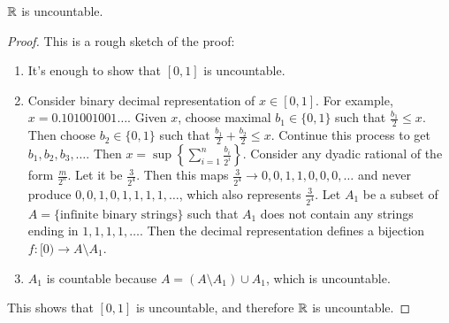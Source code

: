 \begin{thm}
	$\mathbb{R} $ is uncountable.
	\begin{proof}
		This is a rough sketch of the proof:
		\begin{enumerate}
			\item It's enough to show that $[0,1]$ is uncountable.
			\item Consider binary decimal representation of $x \in [0,1]$.
			      For example, $x=0.101001001\ldots$.
			      Given $x$, choose maximal $b_1 \in \{0,1\}$ such that $\frac{b_1}{2}\le x$.
			      Then choose $b_2 \in \{0,1\} $ such that $\frac{b_1}{2}+\frac{b_2}{2} \le x$.
			      Continue this process to get $b_1,b_2,b_3,\ldots$.
			      Then $x=\sup{ \left\{ \sum_{i=1}^{n} \frac{b_i}{2^{i}} \right\} }$.
			      Consider any dyadic rational of the form $\frac{m}{2^{n}}$.
			      Let it be $\frac{3}{2^{4}}$. Then this maps $\frac{3}{2^{4}}\to 0,0,1,1,0,0,0, \ldots $ and never produce $0,0,1,0, 1,1,1,1, \ldots $, which also represents $\frac{3}{2^{4}}$.
			      Let $A_1$ be a subset of $A=\{\text{infinite binary strings}\}$ such that $A_1$ does not contain any strings ending in $1,1,1,1, \ldots $.
			      Then the decimal representation defines a bijection
			      $f: [0)\to A \setminus A_1$.
			\item $A_1$ is countable because $A=(A \setminus A_1) \cup A_1$, which is uncountable.
		\end{enumerate}
		This shows that $[0,1]$ is uncountable, and therefore $\mathbb{R} $ is uncountable.
	\end{proof}
\end{thm}

